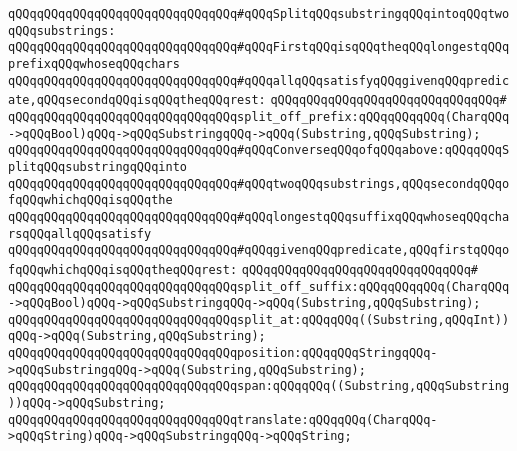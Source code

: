 \newline
\verb|qQQqqQQqqQQqqQQqqQQqqQQqqQQqqQQq#qQQqSplitqQQqsubstringqQQqintoqQQqtwoqQQqsubstrings:|\newline
\verb|qQQqqQQqqQQqqQQqqQQqqQQqqQQqqQQq#qQQqFirstqQQqisqQQqtheqQQqlongestqQQqprefixqQQqwhoseqQQqchars|\newline
\verb|qQQqqQQqqQQqqQQqqQQqqQQqqQQqqQQq#qQQqallqQQqsatisfyqQQqgivenqQQqpredicate,qQQqsecondqQQqisqQQqtheqQQqrest:|\newline
\verb|qQQqqQQqqQQqqQQqqQQqqQQqqQQqqQQq#|\newline
\verb|qQQqqQQqqQQqqQQqqQQqqQQqqQQqqQQqsplit_off_prefix:qQQqqQQqqQQq(CharqQQq->qQQqBool)qQQq->qQQqSubstringqQQq->qQQq(Substring,qQQqSubstring);|\newline
\newline
\verb|qQQqqQQqqQQqqQQqqQQqqQQqqQQqqQQq#qQQqConverseqQQqofqQQqabove:qQQqqQQqSplitqQQqsubstringqQQqinto|\newline
\verb|qQQqqQQqqQQqqQQqqQQqqQQqqQQqqQQq#qQQqtwoqQQqsubstrings,qQQqsecondqQQqofqQQqwhichqQQqisqQQqthe|\newline
\verb|qQQqqQQqqQQqqQQqqQQqqQQqqQQqqQQq#qQQqlongestqQQqsuffixqQQqwhoseqQQqcharsqQQqallqQQqsatisfy|\newline
\verb|qQQqqQQqqQQqqQQqqQQqqQQqqQQqqQQq#qQQqgivenqQQqpredicate,qQQqfirstqQQqofqQQqwhichqQQqisqQQqtheqQQqrest:|\newline
\verb|qQQqqQQqqQQqqQQqqQQqqQQqqQQqqQQq#|\newline
\verb|qQQqqQQqqQQqqQQqqQQqqQQqqQQqqQQqsplit_off_suffix:qQQqqQQqqQQq(CharqQQq->qQQqBool)qQQq->qQQqSubstringqQQq->qQQq(Substring,qQQqSubstring);|\newline
\newline
\verb|qQQqqQQqqQQqqQQqqQQqqQQqqQQqqQQqsplit_at:qQQqqQQq((Substring,qQQqInt))qQQq->qQQq(Substring,qQQqSubstring);|\newline
\newline
\verb|qQQqqQQqqQQqqQQqqQQqqQQqqQQqqQQqposition:qQQqqQQqStringqQQq->qQQqSubstringqQQq->qQQq(Substring,qQQqSubstring);|\newline
\newline
\verb|qQQqqQQqqQQqqQQqqQQqqQQqqQQqqQQqspan:qQQqqQQq((Substring,qQQqSubstring))qQQq->qQQqSubstring;|\newline
\newline
\verb|qQQqqQQqqQQqqQQqqQQqqQQqqQQqqQQqtranslate:qQQqqQQq(CharqQQq->qQQqString)qQQq->qQQqSubstringqQQq->qQQqString;|\newline
\newline
